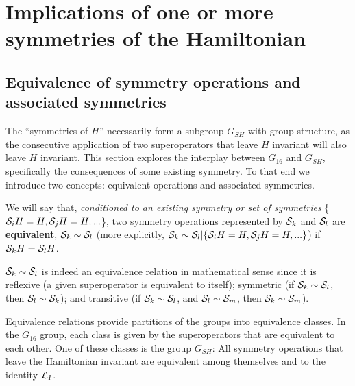 {%
%


\section{Implications of one or more  symmetries of the Hamiltonian \label{collapse}}

\subsection{Equivalence of symmetry operations and associated symmetries\label{secx}}
%
The  ``symmetries of $H$'' necessarily form a subgroup $G_{SH}$ with group structure, as the consecutive application of two
superoperators that leave $H$ invariant will also leave $H$ invariant.
This section explores the interplay between $G_{16}$ and $G_{SH}$, specifically the consequences of some existing symmetry. To that end we introduce two concepts: equivalent operations and associated symmetries.





We will say that,  {\it conditioned to  an existing symmetry or set of symmetries} \{${\cal S}_{i} H=H,
{\cal S}_{j}H=H, ...$\},
{two symmetry operations represented by ${\cal S}_k$  and ${\cal S}_l$ are {\bf equivalent},
${\cal S}_k\sim{\cal S}_l$ (more explicitly,  ${\cal S}_k\sim{\cal S}_l|\{{\cal S}_{i} H=H,
{\cal S}_{j}H=H, ...\}$)
if
${\cal S}_k H={\cal S}_l H$.}



${\cal S}_k\sim{\cal S}_l$  is indeed an equivalence relation in mathematical sense since it is
reflexive (a given superoperator is equivalent to itself); symmetric (if ${\cal S}_k\sim{\cal S}_l$, then
${\cal S}_l\sim{\cal S}_k$); and transitive (if ${\cal S}_k\sim{\cal S}_l$, and
${\cal S}_l\sim{\cal S}_m$, then ${\cal S}_k\sim{\cal S}_m$).



Equivalence relations provide partitions
 of the groups into  equivalence classes. In the $G_{16}$ group, each class is given by the superoperators that are equivalent to each other.   One of these classes is the group $G_{SH}$: All symmetry operations that leave the Hamiltonian invariant are equivalent among themselves and to the identity ${\cal L}_I$.


}
